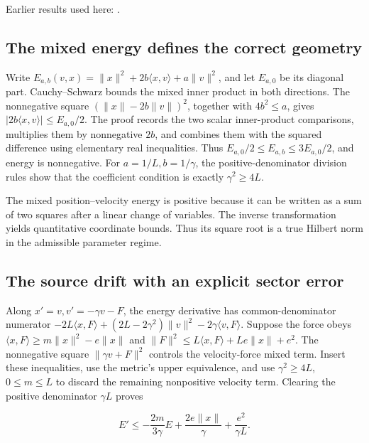 \documentclass[11pt,a4paper]{report}
\begin{document}
Earlier results used here: \cite[Section~3.10]{LangevinLean2026ULASC}.
\subsection{\texorpdfstring{The mixed energy defines the correct geometry}{The mixed energy defines the correct geometry}}
\label{report-step-KineticLangevin-OBABOEnergy-lean-1}


Write \(E_{a,b}(v,x)=\|x\|^2+2b\langle x,v\rangle+a\|v\|^2\), and let \(E_{a,0}\) be its diagonal part. Cauchy–Schwarz bounds the mixed inner product in both directions. The nonnegative square \((\|x\|-2b\|v\|)^2\), together with \(4b^2\le a\), gives \(|2b\langle x,v\rangle|\le E_{a,0}/2\). The proof records the two scalar inner-product comparisons, multiplies them by nonnegative \(2b\), and combines them with the squared difference using elementary real inequalities. Thus \(E_{a,0}/2\le E_{a,b}\le3E_{a,0}/2\), and energy is nonnegative. For \(a=1/L,b=1/\gamma\), the positive-denominator division rules show that the coefficient condition is exactly \(\gamma^2\ge4L\).



The mixed position–velocity energy is positive because it can be written as a sum of two squares after a linear change of variables. The inverse transformation yields quantitative coordinate bounds. Thus its square root is a true Hilbert norm in the admissible parameter regime.

\subsection{\texorpdfstring{The source drift with an explicit sector error}{The source drift with an explicit sector error}}
\label{report-step-KineticLangevin-OBABOEnergy-lean-2}


Along \(x'=v,v'=-\gamma v-F\), the energy derivative has common-denominator numerator \(-2L\langle x,F\rangle+(2L-2\gamma^2)\|v\|^2-2\gamma\langle v,F\rangle\). Suppose the force obeys \(\langle x,F\rangle\ge m\|x\|^2-e\|x\|\) and \(\|F\|^2\le L\langle x,F\rangle+Le\|x\|+e^2\). The nonnegative square \(\|\gamma v+F\|^2\) controls the velocity-force mixed term. Insert these inequalities, use the metric's upper equivalence, and use \(\gamma^2\ge4L\), \(0\le m\le L\) to discard the remaining nonpositive velocity term. Clearing the positive denominator \(\gamma L\) proves

\[E'\le-\frac{2m}{3\gamma}E+\frac{2e\|x\|}{\gamma}+\frac{e^2}{\gamma L}.\]
\end{document}
